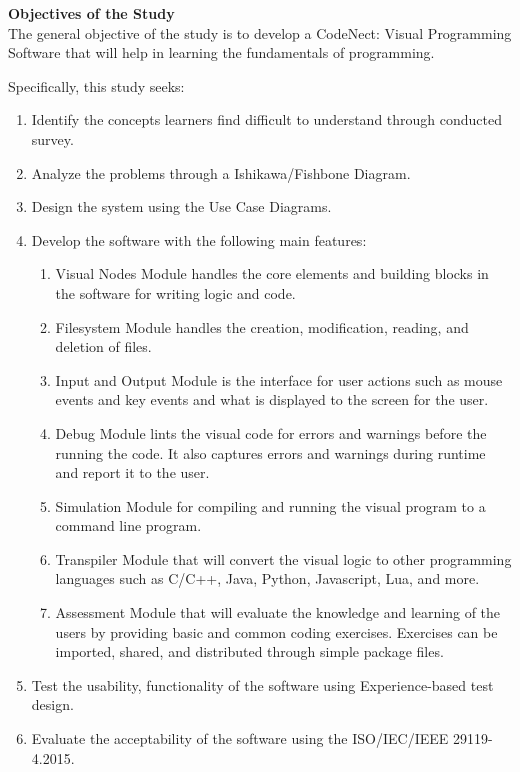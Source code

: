\flushleft
\textbf{Objectives of the Study}\\
\justifying
\parx
The general objective of the study is to develop a CodeNect: Visual Programming
Software that will help in learning the fundamentals of programming.

\parx
Specifically, this study seeks:

\begin{enumerate}
	\item Identify the concepts learners find difficult to understand through conducted survey.
	\item Analyze the problems through a Ishikawa/Fishbone Diagram.
	\item Design the system using the Use Case Diagrams.
	\item Develop the software with the following main features:

		\begin{enumerate}
			\item Visual Nodes Module handles the core elements and building blocks
				in the software for writing logic and code.
			\item Filesystem Module handles the creation, modification, reading, and
				deletion of files.
			\item Input and Output Module is the interface for user actions such as mouse
				events and key events and what is displayed to the screen for the user.
			\item Debug Module lints the visual code for errors and warnings before
				the running the code. It also captures errors and warnings during runtime
				and report it to the user.
			\item Simulation Module for compiling and running the visual program to
				a command line program.
			\item Transpiler Module that will convert the visual logic to other
				programming languages such as C/C++, Java, Python, Javascript, Lua, and
				more.
			\item Assessment Module that will evaluate the knowledge and learning of the
				users by providing basic and common coding exercises. Exercises can be
				imported, shared, and distributed through simple package files.
		\end{enumerate}

	\item Test the usability, functionality of the software using Experience-based test design.

	\item Evaluate the acceptability of the software using the ISO/IEC/IEEE 29119-4.2015. \\
\end{enumerate}
